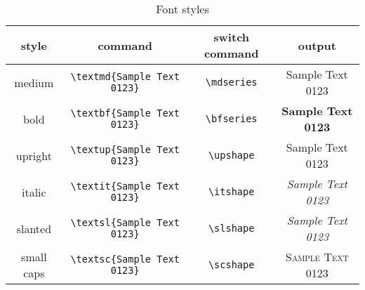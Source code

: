 \begin{table}[h]
\caption{Font styles}
\begin{tabular}{cccc}
\hline \textbf{style} & \textbf{command} & \textbf{switch command} & \textbf{output} \\ 
\hline medium & \lstinline[language={[LaTeX]TeX}]|\textmd{Sample Text 0123}| & \lstinline[language={[LaTeX]TeX}]|\mdseries| & \textmd{Sample Text 0123} \\ 
\hline bold & \lstinline[language={[LaTeX]TeX}]|\textbf{Sample Text 0123}| & \lstinline[language={[LaTeX]TeX}]|\bfseries| & \textbf{Sample Text 0123} \\ 
\hline upright & \lstinline[language={[LaTeX]TeX}]|\textup{Sample Text 0123}| & \lstinline[language={[LaTeX]TeX}]|\upshape| & \textup{Sample Text 0123} \\ 
\hline italic & \lstinline[language={[LaTeX]TeX}]|\textit{Sample Text 0123}| & \lstinline[language={[LaTeX]TeX}]|\itshape| & \textit{Sample Text 0123} \\ 
\hline slanted & \lstinline[language={[LaTeX]TeX}]|\textsl{Sample Text 0123}| & \lstinline[language={[LaTeX]TeX}]|\slshape| & \textsl{Sample Text 0123} \\ 
\hline small caps & \lstinline[language={[LaTeX]TeX}]|\textsc{Sample Text 0123}| & \lstinline[language={[LaTeX]TeX}]|\scshape| & \textsc{Sample Text 0123} \\ 
\hline 
\end{tabular} 
\end{table}